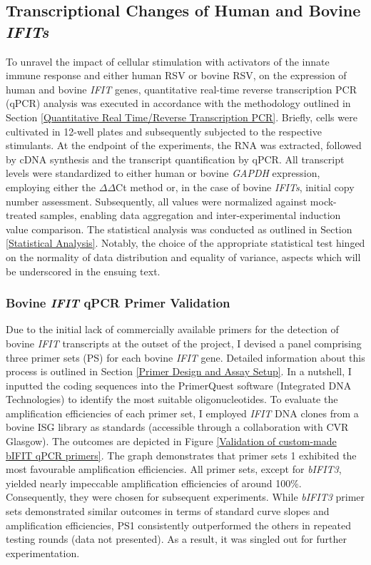 \subsection{Transcriptional Changes of Human and Bovine \textit{IFITs}} \label{Transcriptional Changes of Human and Bovine \textit{IFITs}}
To unravel the impact of cellular stimulation with activators of the innate immune response and either human RSV or bovine RSV, on the expression of human and bovine \textit{IFIT} genes, quantitative real-time reverse transcription PCR (qPCR) analysis was executed in accordance with the methodology outlined in Section \ref{Quantitative Real Time/Reverse Transcription PCR}. Briefly, cells were cultivated in 12-well plates and subsequently subjected to the respective stimulants. At the endpoint of the experiments, the RNA was extracted, followed by cDNA synthesis and the transcript quantification by qPCR. All transcript levels were standardized to either human or bovine \textit{GAPDH} expression, employing either the 
\(\Delta\)\(\Delta\)Ct method or, in the case of bovine \textit{IFITs}, initial copy number assessment. Subsequently, all values were normalized against mock-treated samples, enabling data aggregation and inter-experimental induction value comparison. The statistical analysis was conducted as outlined in Section \ref{Statistical Analysis}. Notably, the choice of the appropriate statistical test hinged on the normality of data distribution and equality of variance, aspects which will be underscored in the ensuing text.




\subsubsection{Bovine \textit{IFIT} qPCR Primer Validation} \label{Bovine IFIT qPCR Primer Validation}

Due to the initial lack of commercially available primers for the detection of bovine \textit{IFIT} transcripts at the outset of the project, I devised a panel comprising three primer sets (PS) for each bovine \textit{IFIT} gene. Detailed information about this process is outlined in Section \ref{Primer Design and Assay Setup}. In a nutshell, I inputted the coding sequences into the PrimerQuest software (Integrated DNA Technologies) to identify the most suitable oligonucleotides. To evaluate the amplification efficiencies of each primer set, I employed \textit{IFIT} DNA clones from a bovine ISG library as standards (accessible through a collaboration with CVR Glasgow). The outcomes are depicted in Figure \ref{Validation of custom-made bIFIT qPCR primers}. The graph demonstrates that primer sets 1 exhibited the most favourable amplification efficiencies. All primer sets, except for \textit{bIFIT3}, yielded nearly impeccable amplification efficiencies of around 100\%. Consequently, they were chosen for subsequent experiments. While \textit{bIFIT3} primer sets demonstrated similar outcomes in terms of standard curve slopes and amplification efficiencies, PS1 consistently outperformed the others in repeated testing rounds (data not presented). As a result, it was singled out for further experimentation.

